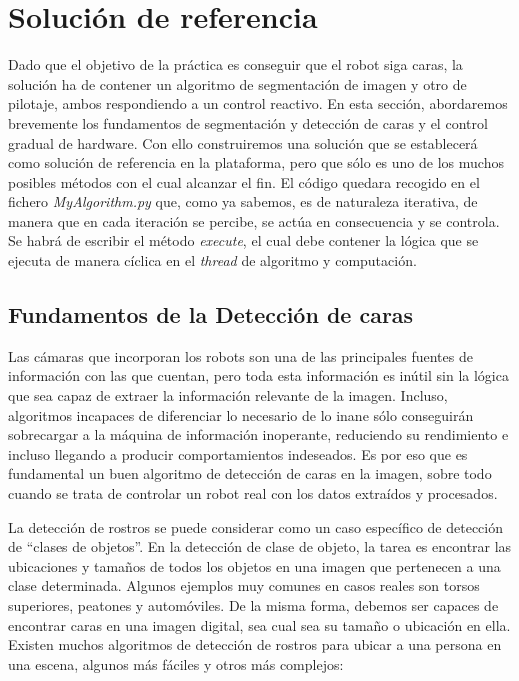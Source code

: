 \section{Solución de referencia}
Dado que el objetivo de la práctica es conseguir que el robot siga caras, la solución ha de contener un algoritmo de segmentación de imagen y otro de pilotaje, ambos respondiendo a un control reactivo. 
En esta sección, abordaremos brevemente los fundamentos de segmentación y detección de caras y el control gradual de hardware. Con ello construiremos una solución que se establecerá como solución de referencia en la plataforma, pero que sólo es uno de los muchos posibles métodos con el cual alcanzar el fin. El código quedara recogido en el fichero \textit{MyAlgorithm.py} que, como ya sabemos, es de naturaleza iterativa, de manera que en cada iteración se percibe, se actúa en consecuencia y se controla. Se habrá de escribir el método \textit{execute}, el cual debe contener la lógica que se ejecuta de manera cíclica en el \textit{thread} de algoritmo y computación.

\subsection{Fundamentos de la Detección de caras}
Las cámaras que incorporan los robots son una de las principales fuentes de información con las que cuentan, pero toda esta información es inútil sin la lógica que sea capaz de extraer la información relevante de la imagen. Incluso, algoritmos incapaces de diferenciar lo necesario de lo inane sólo conseguirán sobrecargar a la máquina de información inoperante, reduciendo su rendimiento e incluso llegando a producir comportamientos indeseados. Es por eso que es fundamental un buen algoritmo de detección de caras en la imagen, sobre todo cuando se trata de controlar un robot real con los datos extraídos y procesados. 

La detección de rostros se puede considerar como un caso específico de detección de “clases de objetos”. En la detección de clase de objeto, la tarea es encontrar las ubicaciones y tamaños de todos los objetos en una imagen que pertenecen a una clase determinada. Algunos ejemplos muy comunes en casos reales son torsos superiores, peatones y automóviles. De la misma forma, debemos ser capaces de encontrar caras en una imagen digital, sea cual sea su tamaño o ubicación en ella. Existen muchos algoritmos de detección de rostros para ubicar a una persona en una escena, algunos más fáciles y otros más complejos:


